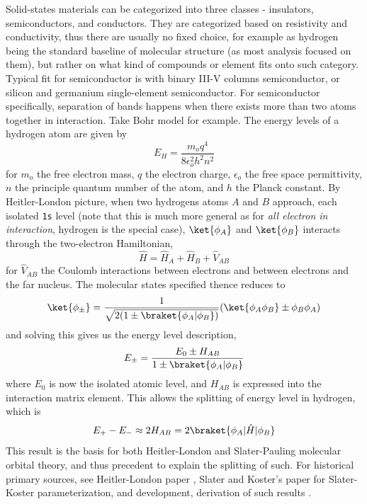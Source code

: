 Solid-states materials can be categorized into three classes - insulators, semiconductors, and conductors. They are categorized based on resistivity and conductivity, thus there are usually no fixed choice, for example as hydrogen being the standard baseline of molecular structure (as most analysis focused on them), but rather on what kind of compounds or element fits onto such category. Typical fit for semiconductor is with binary III-V columns semiconductor, or silicon and germanium single-element semiconductor. For semiconductor specifically, separation of bands happens when there exists more than two atoms together in interaction. Take Bohr model for example. The energy levels of a hydrogen atom are given by
\begin{equation}
    E_{H} = \frac{m_{o}q^{4}}{8\epsilon_{o}^{2}h^{2}n^2}
\end{equation}
for $m_{o}$ the free electron mass, $q$ the electron charge, $\epsilon_{o}$ the free space permittivity, $n$ the principle quantum number of the atom, and $h$ the Planck constant. By Heitler-London picture, when two hydrogens atoms $A$ and $B$ approach, each isolated \texttt{1s} level (note that this is much more general as for \textit{all electron in interaction}, hydrogen is the special case), $\ket{\phi_{A}}$ and $\ket{\phi_{B}}$ interacts through the two-electron Hamiltonian,
\begin{equation}
    \hat{H} = \hat{H}_{A} + \hat{H}_{B} + \hat{V}_{AB}
\end{equation}
for $\hat{V}_{AB}$ the Coulomb interactions between electrons and between electrons and the far nucleus. The molecular states specified thence reduces to
\begin{equation}
    \ket{\phi_{\pm}} = \frac{1}{\sqrt{2(1\pm \braket{\phi_{A}|\phi_{B}})}}(\ket{\phi_{A}\phi_{B}}\pm\phi_{B}\phi_{A})
\end{equation}
and solving this gives us the energy level description,
\begin{equation}
    E_{\pm} = \frac{E_{0}\pm H_{AB}}{1\pm \braket{\phi_{A}|\phi_{B}}}
\end{equation}
where $E_{0}$ is now the isolated atomic level, and $H_{AB}$ is expressed into the interaction matrix element. This allows the splitting of energy level in hydrogen, which is
\begin{equation}
    E_{+} - E_{-} \approx 2H_{AB} = 2 \braket{\phi_{A}|\hat{H}|\phi_{B}}
\end{equation}
This result is the basis for both Heitler-London and Slater-Pauling molecular orbital theory, and thus precedent to explain the splitting of such. For historical primary sources, see Heitler-London paper \cite{HeitlerLondon1927}, Slater and Koster's paper \cite{SlaterKoster1954} for Slater-Koster parameterization, and development, derivation of such results \cite{Papaconstantopoulos2003,Harrison1980,AshcroftMermin1976,kittel2005,SzaboOstlund1989,KolosWolniewicz1965}. 

